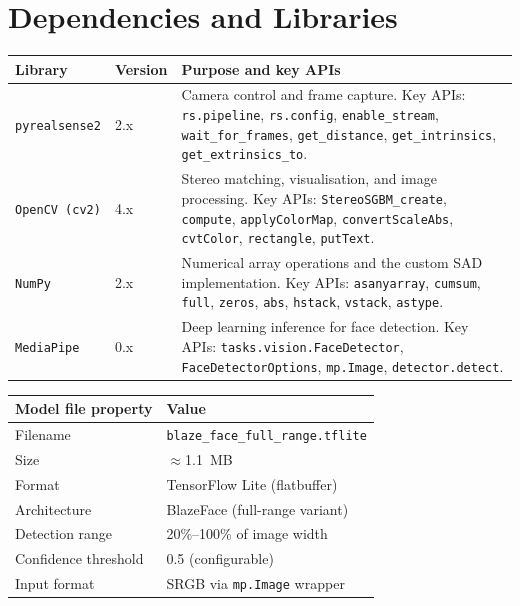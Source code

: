 \documentclass[12pt, a4paper]{article}
\newcommand{\code}[1]{\texttt{\small#1}}
\begin{document}
\newpage
\section{Dependencies and Libraries}

\begin{center}
\begin{tabularx}{\linewidth}{llX}
  \toprule
  \textbf{Library} & \textbf{Version} & \textbf{Purpose and key APIs} \\
  \midrule
  \code{pyrealsense2} & 2.x &
    Camera control and frame capture. Key APIs: \code{rs.pipeline},
    \code{rs.config}, \code{enable\_stream}, \code{wait\_for\_frames},
    \code{get\_distance}, \code{get\_intrinsics}, \code{get\_extrinsics\_to}. \\[4pt]

  \code{OpenCV (cv2)} & 4.x &
    Stereo matching, visualisation, and image processing. Key APIs:
    \code{StereoSGBM\_create}, \code{compute}, \code{applyColorMap},
    \code{convertScaleAbs}, \code{cvtColor}, \code{rectangle}, \code{putText}. \\[4pt]

  \code{NumPy} & 2.x &
    Numerical array operations and the custom SAD implementation. Key APIs:
    \code{asanyarray}, \code{cumsum}, \code{full}, \code{zeros}, \code{abs},
    \code{hstack}, \code{vstack}, \code{astype}. \\[4pt]

  \code{MediaPipe} & 0.x &
    Deep learning inference for face detection. Key APIs:
    \code{tasks.vision.FaceDetector}, \code{FaceDetectorOptions},
    \code{mp.Image}, \code{detector.detect}. \\
  \bottomrule
\end{tabularx}
\end{center}

\begin{center}
\begin{tabular}{ll}
  \toprule
  \textbf{Model file property} & \textbf{Value} \\
  \midrule
  Filename          & \code{blaze\_face\_full\_range.tflite} \\
  Size              & $\approx$1.1~MB \\
  Format            & TensorFlow Lite (flatbuffer) \\
  Architecture      & BlazeFace (full-range variant) \\
  Detection range   & 20\%--100\% of image width \\
  Confidence threshold & 0.5 (configurable) \\
  Input format      & SRGB via \code{mp.Image} wrapper \\
  \bottomrule
\end{tabular}
\end{center}
\end{document}
